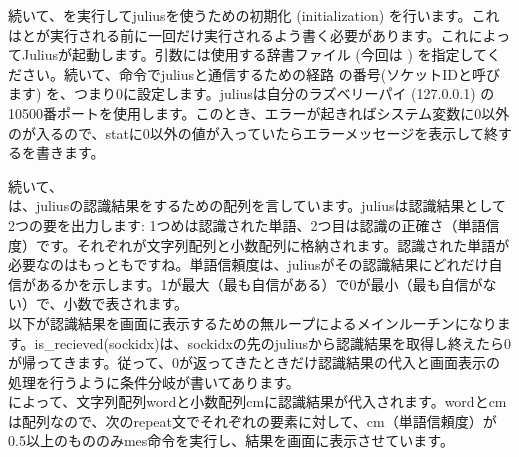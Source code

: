 続いて、を実行してjuliusを使うための初期化 (initialization) を行います。これはとが実行される前に一回だけ実行されるよう書く必要があります。これによってJuliusが起動します。引数には使用する辞書ファイル (今回は ) を指定してください。続いて、命令でjuliusと通信するための経路 の番号(ソケットIDと呼びます) を、つまり0に設定します。juliusは自分のラズベリーパイ (127.0.0.1) の10500番ポートを使用します。このとき、エラーが起きればシステム変数に0以外のが入るので、statに0以外の値が入っていたらエラーメッセージを表示して終するを書きます。

続いて、\\
は、juliusの認識結果をするための配列を言しています。juliusは認識結果として2つの要を出力します: 1つめは認識された単語、2つ目は認識の正確さ（単語信度）です。それぞれが文字列配列と小数配列に格納されます。認識された単語が必要なのはもっともですね。単語信頼度は、juliusがその認識結果にどれだけ自信があるかを示します。1が最大（最も自信がある）で0が最小（最も自信がない）で、小数で表されます。\\
以下が認識結果を画面に表示するための無ループによるメインルーチンになります。is\_recieved(sockidx)は、sockidxの先のjuliusから認識結果を取得し終えたら0が帰ってきます。従って、0が返ってきたときだけ認識結果の代入と画面表示の処理を行うように条件分岐が書いてあります。\\
によって、文字列配列wordと小数配列cmに認識結果が代入されます。wordとcmは配列なので、次のrepeat文でそれぞれの要素に対して、cm（単語信頼度）が0.5以上のもののみmes命令を実行し、結果を画面に表示させています。\\
\begin{tcolorbox}[title=\useOmetoi]
\begin{enumerate}
\end{enumerate}
\end{tcolorbox}
